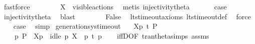 \begin{isabellebody}
\ fastforce\isanewline
{}\isamarkupfalse%
\isanewline
\ \ \isamarkupfalse%
\ {}\isanewline
\ \ \isamarkupfalse%
\ {\isacartoucheopen}X\ {\isasymsubseteq}\ visible{\isacharunderscore}{\kern0pt}actions{\isacartoucheclose}\ \isamarkupfalse%
\ {\isacharparenleft}{\kern0pt}metis\ injectivity{\isacharunderscore}{\kern0pt}theta{\isacharparenleft}{\kern0pt}{}{\isacharparenright}{\kern0pt}{\isacharparenright}{\kern0pt}\isanewline
\ \ \isamarkupfalse%
\ {}\ \isamarkupfalse%
\ {\isacharquery}{\kern0pt}case\ \isamarkupfalse%
\ injectivity{\isacharunderscore}{\kern0pt}theta{\isacharparenleft}{\kern0pt}{}{\isacharparenright}{\kern0pt}\ \isamarkupfalse%
\ blast\isanewline
{}\isamarkupfalse%
\isanewline
\ \ \isamarkupfalse%
\ {}\isanewline
\ \ \isamarkupfalse%
\ False\ \isamarkupfalse%
\ lts{\isacharunderscore}{\kern0pt}timeout{\isacharunderscore}{\kern0pt}axioms\ lts{\isacharunderscore}{\kern0pt}timeout{\isacharunderscore}{\kern0pt}def\ \isamarkupfalse%
\ force\isanewline
\ \ \isamarkupfalse%
\ {\isacharquery}{\kern0pt}case\ \isamarkupfalse%
\ simp\isanewline
{}\isamarkupfalse%
%
\endisatagproof
{\isafoldproof}%
%
\isadelimproof
\isanewline
%
\endisadelimproof
\isanewline
{}\isamarkupfalse%
\ generation{\isacharunderscore}{\kern0pt}sys{\isacharunderscore}{\kern0pt}timeout{\isacharcolon}{\kern0pt}\isanewline
\ \ \ {\isacartoucheopen}{\isasymtheta}{\isacharbrackleft}{\kern0pt}X{\isacharbrackright}{\kern0pt}{\isacharparenleft}{\kern0pt}p{\isacharparenright}{\kern0pt}\ {\isasymlongmapsto}\isactrlsup {\isasymtheta}t\ P{\isacharprime}{\kern0pt}{\isacartoucheclose}\isanewline
\ \ \ {\isacartoucheopen}{\isasymexists}\ p{\isacharprime}{\kern0pt}{\isachardot}{\kern0pt}\ P{\isacharprime}{\kern0pt}\ {\isacharequal}{\kern0pt}\ {\isasymtheta}{\isacharbrackleft}{\kern0pt}X{\isacharbrackright}{\kern0pt}{\isacharparenleft}{\kern0pt}p{\isacharprime}{\kern0pt}{\isacharparenright}{\kern0pt}\ {\isasymand}\ idle\ p\ X\ {\isasymand}\ p\ {\isasymlongmapsto}t\ p{\isacharprime}{\kern0pt}{\isacartoucheclose}\isanewline
%
\isadelimproof
\ \ %
\endisadelimproof
%
\isatagproof
{}\isamarkupfalse%
\ iffD{}{\isacharbrackleft}{\kern0pt}OF\ tran{\isacharunderscore}{\kern0pt}theta{\isachardot}{\kern0pt}simps\ assms{\isacharbrackright}{\kern0pt}\isanewline

\end{isabellebody}
